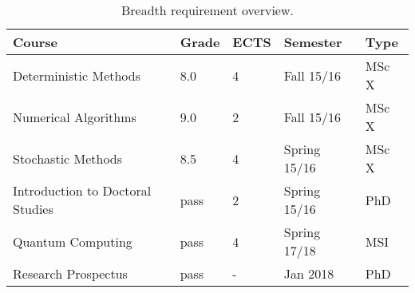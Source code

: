 \begin{table}[h!]
\centering
\caption{Breadth requirement overview.}
\label{tab:courses}
\begin{tabular}{lllll}
\hline
Course                           & Grade & ECTS & Semester & Type  \\ \hline
Deterministic Methods       & 8.0 & 4 & Fall 15/16 & MSc X \\
Numerical Algorithms        & 9.0 & 2 & Fall 15/16 & MSc X \\
Stochastic Methods          & 8.5 & 4 & Spring 15/16 & MSc X \\
Introduction to Doctoral Studies & pass & 2 & Spring 15/16 & PhD \\
Quantum Computing           & pass & 4 & Spring	17/18 & MSI \\
\hline
Research Prospectus &  pass    & -    & Jan 2018  & PhD   \\ \hline
 \hline
\end{tabular}
\end{table}

%
%

